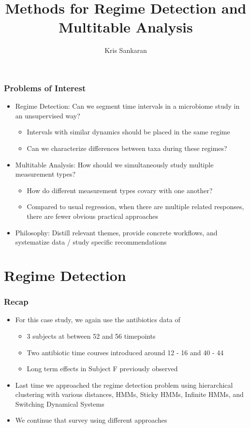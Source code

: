 \documentclass{beamer}
\title{Methods for Regime Detection and Multitable Analysis}
\author{Kris Sankaran}
\begin{document}
\maketitle

\begin{frame}
  \frametitle{Problems of Interest}
 \begin{itemize}
 \item Regime Detection: Can we segment time intervals in a microbiome study in
   an unsupervised way?
   \begin{itemize}
   \item Intervals with similar dynamics should be placed in the same regime
   \item Can we characterize differences between taxa during these regimes?
   \end{itemize}
 \item Multitable Analysis: How should we simultaneously study multiple
   measurement types?
   \begin{itemize}
   \item How do different measurement types covary with one another?
   \item Compared to usual regression, when there are multiple related
     responses, there are fewer obvious practical approaches
   \end{itemize}
 \item Philosophy: Distill relevant themes, provide concrete workflows, and
   systematize data / study specific recommendations
 \end{itemize} 
\end{frame}

\section{Regime Detection}
\label{sec:regime_detection}

\begin{frame}
  \frametitle{Recap}
 \begin{itemize}
 \item For this case study, we again use the antibiotics data of
   \citep{dethlefsen2008pervasive}
   \begin{itemize}
   \item 3 subjects at between 52 and 56 timepoints
   \item Two antibiotic time courses introduced around 12 - 16 and 40 - 44
   \item Long term effects in Subject F previously observed
   \end{itemize} 
 \item Last time we approached the regime detection problem using hierarchical
   clustering with various distances, HMMs, Sticky HMMs, Infinite HMMs, and
   Switching Dynamical Systems
 \item We continue that survey using different approaches
 \end{itemize} 
\end{frame}
\end{document}
